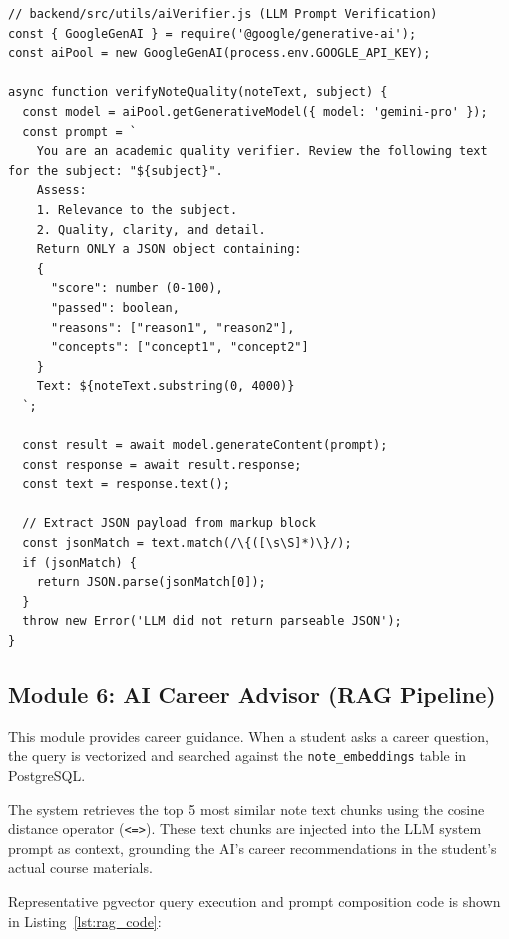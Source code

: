 \documentclass[12,Times new Roman,a4paper]{report}
\begin{document}
\begin{verbatim}
// backend/src/utils/aiVerifier.js (LLM Prompt Verification)
const { GoogleGenAI } = require('@google/generative-ai');
const aiPool = new GoogleGenAI(process.env.GOOGLE_API_KEY);

async function verifyNoteQuality(noteText, subject) {
  const model = aiPool.getGenerativeModel({ model: 'gemini-pro' });
  const prompt = `
    You are an academic quality verifier. Review the following text for the subject: "${subject}".
    Assess:
    1. Relevance to the subject.
    2. Quality, clarity, and detail.
    Return ONLY a JSON object containing:
    {
      "score": number (0-100),
      "passed": boolean,
      "reasons": ["reason1", "reason2"],
      "concepts": ["concept1", "concept2"]
    }
    Text: ${noteText.substring(0, 4000)}
  `;

  const result = await model.generateContent(prompt);
  const response = await result.response;
  const text = response.text();
  
  // Extract JSON payload from markup block
  const jsonMatch = text.match(/\{([\s\S]*)\}/);
  if (jsonMatch) {
    return JSON.parse(jsonMatch[0]);
  }
  throw new Error('LLM did not return parseable JSON');
}
\end{verbatim}
\label{lst:ai_verify_code}

\subsection{Module 6: AI Career Advisor (RAG Pipeline)}

This module provides career guidance. When a student asks a career question, the query is vectorized and searched against the \texttt{note\_embeddings} table in PostgreSQL. 

The system retrieves the top 5 most similar note text chunks using the cosine distance operator (\texttt{<=>}). These text chunks are injected into the LLM system prompt as context, grounding the AI's career recommendations in the student's actual course materials.

Representative pgvector query execution and prompt composition code is shown in Listing~\ref{lst:rag_code}:
\end{document}
